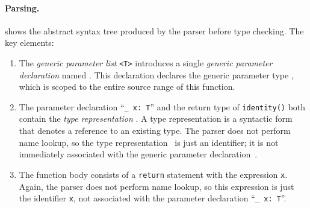 \documentclass[../generics]{subfiles}
\begin{document}
\paragraph{Parsing.}  shows the abstract syntax tree produced by the parser before type checking. The key elements:
\begin{enumerate}
\item The \emph{generic parameter list} \texttt{<T>} introduces a single \emph{generic parameter declaration} named \tT. This declaration declares the generic parameter type \tT, which is scoped to the entire source range of this function.
\item The parameter declaration ``\verb|_ x: T|'' and the return type of \texttt{identity()} both contain the \emph{type representation} \tT. A type representation is a syntactic form that denotes a reference to an existing type. The parser does not perform name lookup, so the type representation \tT\ is just an identifier; it is not immediately associated with the generic parameter declaration~\tT.
\item The function body consists of a \texttt{return} statement with the expression \texttt{x}. Again, the parser does not perform name lookup, so this expression is just the identifier \texttt{x}, not associated with the parameter declaration ``\verb|_ x: T|''.
\end{enumerate}
\end{document}
